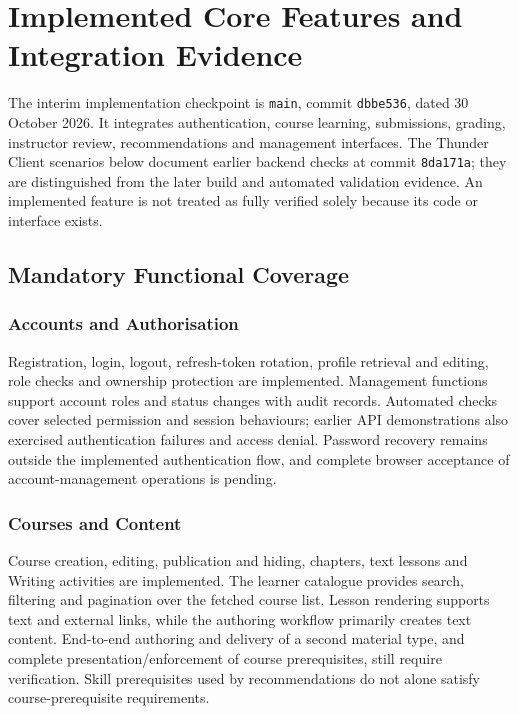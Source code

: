 
\section{Implemented Core Features and Integration Evidence}
\label{sec:core}

The interim implementation checkpoint is \texttt{main}, commit
\texttt{dbbe536}, dated 30 October 2026. It integrates authentication,
course learning, submissions, grading, instructor review, recommendations
and management interfaces. The Thunder Client scenarios below document
earlier backend checks at commit \texttt{8da171a}; they are distinguished
from the later build and automated validation evidence. An implemented
feature is not treated as fully verified solely because its code or
interface exists.

\subsection{Mandatory Functional Coverage}

\subsubsection{Accounts and Authorisation}
Registration, login, logout, refresh-token rotation, profile retrieval and
editing, role checks and ownership protection are implemented. Management
functions support account roles and status changes with audit records.
Automated checks cover selected permission and session behaviours; earlier
API demonstrations also exercised authentication failures and access denial.
Password recovery remains outside the implemented authentication flow, and
complete browser acceptance of account-management operations is pending.

\subsubsection{Courses and Content}
Course creation, editing, publication and hiding, chapters, text lessons and
Writing activities are implemented. The learner catalogue provides search,
filtering and pagination over the fetched course list. Lesson rendering
supports text and external links, while the authoring workflow primarily
creates text content. End-to-end authoring and delivery of a second material
type, and complete presentation/enforcement of course prerequisites, still
require verification. Skill prerequisites used by recommendations do not
alone satisfy course-prerequisite requirements.

